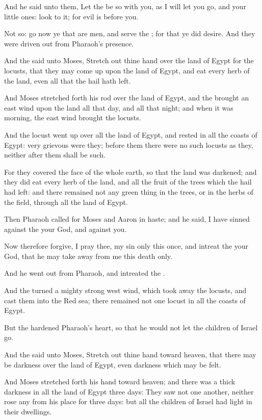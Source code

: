 \verse And he said unto them, Let the \LORD be so with you, as I will
let you go, and your little ones: look to it; for evil is before you.

\verse Not so: go now ye that are men, and serve the \LORD; for that ye
did desire. And they were driven out from Pharaoh's presence.

\verse And the \LORD said unto Moses, Stretch out thine hand over the
land of Egypt for the locusts, that they may come up upon the land of
Egypt, and eat every herb of the land, even all that the hail hath
left.

\verse And Moses stretched forth his rod over the land of Egypt, and
the \LORD brought an east wind upon the land all that day, and all that
night; and when it was morning, the east wind brought the locusts.

\verse And the locust went up over all the land of Egypt, and rested in
all the coasts of Egypt: very grievous were they; before them there
were no such locusts as they, neither after them shall be such.

\verse For they covered the face of the whole earth, so that the land
was darkened; and they did eat every herb of the land, and all the
fruit of the trees which the hail had left: and there remained not any
green thing in the trees, or in the herbs of the field, through all
the land of Egypt.

\verse Then Pharaoh called for Moses and Aaron in haste; and he said, I
have sinned against the \LORD your God, and against you.

\verse Now therefore forgive, I pray thee, my sin only this once, and
intreat the \LORD your God, that he may take away from me this death
only.

\verse And he went out from Pharaoh, and intreated the \LORD.

\verse And the \LORD turned a mighty strong west wind, which took away
the locusts, and cast them into the Red sea; there remained not one
locust in all the coasts of Egypt.

\verse But the \LORD hardened Pharaoh's heart, so that he would not let
the children of Israel go.

\verse And the \LORD said unto Moses, Stretch out thine hand toward
heaven, that there may be darkness over the land of Egypt, even
darkness which may be felt.

\verse And Moses stretched forth his hand toward heaven; and there was
a thick darkness in all the land of Egypt three days: \verse They saw
not one another, neither rose any from his place for three days: but
all the children of Israel had light in their dwellings.

